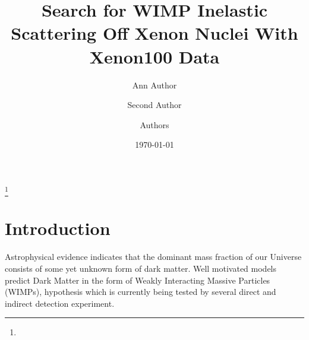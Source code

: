 \documentclass[%
 reprint,
 amsmath,amssymb,
 aps,
]{revtex4-1}
\begin{document}

\title{Search for WIMP Inelastic Scattering Off Xenon Nuclei With Xenon100 Data}%
\thanks{}%

\author{Ann Author}
\author{Second Author}%
%


\author{Authors}
%
%


\date{\today}%

\begin{abstract}

\end{abstract}

\maketitle


\section{\label{sec:level1} Introduction}
Astrophysical evidence indicates that the dominant mass fraction of our Universe consists of some yet unknown form
of dark matter. Well motivated models predict Dark Matter in the form of Weakly Interacting Massive Particles (WIMPs),
hypothesis which is currently being tested by several direct and indirect detection experiment.
\end{document}
